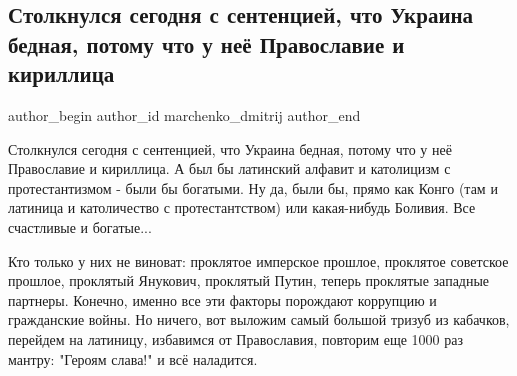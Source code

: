  
 
 
 
 
 
\subsection{Столкнулся сегодня с сентенцией, что Украина бедная, потому что у неё Православие и кириллица}
\label{sec:25_08_2021.fb.marchenko_dmitrij.1.ukraina_kirillica_bednost}
 
\ifcmt
 author_begin
   author_id marchenko_dmitrij
 author_end
\fi

Столкнулся сегодня с сентенцией, что Украина бедная, потому что у неё
Православие и кириллица. А был бы латинский алфавит и католицизм с
протестантизмом - были бы богатыми. Ну да, были бы, прямо как Конго (там и
латиница и католичество с протестантством) или какая-нибудь Боливия. Все
счастливые и богатые...

Кто только у них не виноват: проклятое имперское прошлое, проклятое советское
прошлое, проклятый Янукович, проклятый Путин, теперь проклятые западные
партнеры. Конечно, именно все эти факторы порождают коррупцию и гражданские
войны. Но ничего, вот выложим самый большой тризуб из кабачков, перейдем на
латиницу, избавимся от Православия, повторим еще 1000 раз мантру: "Героям
слава!" и всё наладится.

